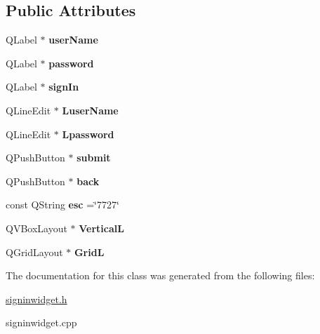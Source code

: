 \subsection*{Public Attributes}
\begin{DoxyCompactItemize}
\item 
\hypertarget{classsignInWidget_ae4ab0ed7451d4bbfe61d8328e83e3766}{Q\-Label $\ast$ {\bfseries user\-Name}}\label{classsignInWidget_ae4ab0ed7451d4bbfe61d8328e83e3766}

\item 
\hypertarget{classsignInWidget_aa753e14dd5bbffccd53966d4d1633e91}{Q\-Label $\ast$ {\bfseries password}}\label{classsignInWidget_aa753e14dd5bbffccd53966d4d1633e91}

\item 
\hypertarget{classsignInWidget_a7632081071e38d207e33a209f8788680}{Q\-Label $\ast$ {\bfseries sign\-In}}\label{classsignInWidget_a7632081071e38d207e33a209f8788680}

\item 
\hypertarget{classsignInWidget_afc7125ac8e5cc70b86e35b14f8da530c}{Q\-Line\-Edit $\ast$ {\bfseries Luser\-Name}}\label{classsignInWidget_afc7125ac8e5cc70b86e35b14f8da530c}

\item 
\hypertarget{classsignInWidget_ac67d104f98b8d0a287ad1e0706df390b}{Q\-Line\-Edit $\ast$ {\bfseries Lpassword}}\label{classsignInWidget_ac67d104f98b8d0a287ad1e0706df390b}

\item 
\hypertarget{classsignInWidget_acb6ab5b841a66c8a29a110f701f07280}{Q\-Push\-Button $\ast$ {\bfseries submit}}\label{classsignInWidget_acb6ab5b841a66c8a29a110f701f07280}

\item 
\hypertarget{classsignInWidget_a17d9ba4c4b39786aaf8f647490479bd1}{Q\-Push\-Button $\ast$ {\bfseries back}}\label{classsignInWidget_a17d9ba4c4b39786aaf8f647490479bd1}

\item 
\hypertarget{classsignInWidget_af8d41288ebb746bba83745a0f69c2317}{const Q\-String {\bfseries esc} =\char`\"{}7727\char`\"{}}\label{classsignInWidget_af8d41288ebb746bba83745a0f69c2317}

\item 
\hypertarget{classsignInWidget_a8f856df0c75d4cc339def8fc414c5f02}{Q\-V\-Box\-Layout $\ast$ {\bfseries Vertical\-L}}\label{classsignInWidget_a8f856df0c75d4cc339def8fc414c5f02}

\item 
\hypertarget{classsignInWidget_ab1633e2a3f7faa14b294122f91468792}{Q\-Grid\-Layout $\ast$ {\bfseries Grid\-L}}\label{classsignInWidget_ab1633e2a3f7faa14b294122f91468792}

\end{DoxyCompactItemize}


The documentation for this class was generated from the following files\-:\begin{DoxyCompactItemize}
\item 
\hyperlink{signinwidget_8h}{signinwidget.\-h}\item 
signinwidget.\-cpp\end{DoxyCompactItemize}
